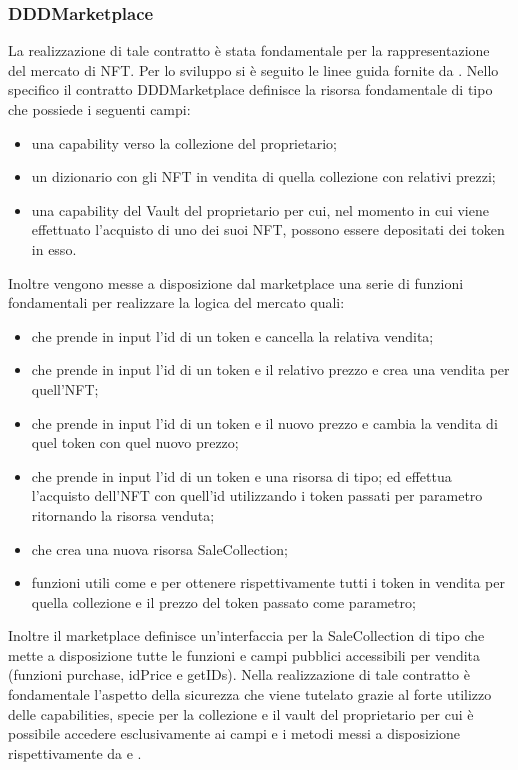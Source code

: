 \subsubsection{DDDMarketplace}
La realizzazione di tale contratto è  stata fondamentale per la rappresentazione del mercato di NFT. Per lo sviluppo si è seguito le linee guida fornite da \cite{web:marketplace}. Nello specifico il contratto DDDMarketplace definisce la risorsa fondamentale di tipo  che possiede i seguenti campi:
\begin{itemize}
    \item una capability verso la collezione del proprietario;
    \item un dizionario con gli NFT in vendita di quella collezione con relativi prezzi;
    \item una capability del Vault del proprietario per cui, nel momento in cui viene effettuato l'acquisto di uno dei suoi NFT, possono essere depositati dei token in esso.
\end{itemize}
Inoltre vengono messe a disposizione dal marketplace una serie di funzioni fondamentali per realizzare la logica del mercato quali:
\begin{itemize}
    \item {} che prende in input l'id di un token e cancella la relativa vendita;
    \item {} che prende in input l'id di un token e il relativo prezzo e crea una vendita per quell'NFT;
    \item {} che prende in input l'id di un token e il nuovo prezzo e cambia la vendita di quel token con quel nuovo prezzo;
    \item {} che prende in input l'id di un token e una risorsa di tipo; ed effettua l'acquisto dell'NFT con quell'id utilizzando i token passati per parametro ritornando la risorsa venduta;
    \item {} che crea una nuova risorsa SaleCollection;
    \item funzioni utili come  e  per ottenere rispettivamente tutti i token in vendita per quella collezione e il prezzo del token passato come parametro;
\end{itemize}

Inoltre il marketplace definisce un'interfaccia per la SaleCollection di tipo  che mette a disposizione tutte le funzioni e campi pubblici accessibili per vendita (funzioni purchase, idPrice e getIDs). Nella realizzazione di tale contratto è fondamentale l'aspetto della sicurezza che viene tutelato grazie al forte utilizzo delle capabilities, specie per la collezione e il vault del proprietario per cui è possibile accedere esclusivamente ai campi e i metodi messi a disposizione rispettivamente da  e .

